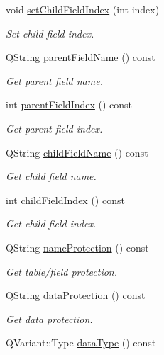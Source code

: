 \begin{DoxyCompactItemize}
void \hyperlink{classmdt_sql_relation_item_a870cfae68f4913225e0ae48554c3163f}{set\-Child\-Field\-Index} (int index)
\begin{DoxyCompactList}\small\item\em Set child field index. \end{DoxyCompactList}\item 
Q\-String \hyperlink{classmdt_sql_relation_item_aa660ce6575b4ce9ad9d551d0b284e528}{parent\-Field\-Name} () const 
\begin{DoxyCompactList}\small\item\em Get parent field name. \end{DoxyCompactList}\item 
int \hyperlink{classmdt_sql_relation_item_a18d078e5e784de2d0e14cbb6238155f9}{parent\-Field\-Index} () const 
\begin{DoxyCompactList}\small\item\em Get parent field index. \end{DoxyCompactList}\item 
Q\-String \hyperlink{classmdt_sql_relation_item_a8cd667086a4ace612b009b0eb7494a1c}{child\-Field\-Name} () const 
\begin{DoxyCompactList}\small\item\em Get child field name. \end{DoxyCompactList}\item 
int \hyperlink{classmdt_sql_relation_item_a89f5e403c31df53c56ddfc4448d8b91d}{child\-Field\-Index} () const 
\begin{DoxyCompactList}\small\item\em Get child field index. \end{DoxyCompactList}\item 
Q\-String \hyperlink{classmdt_sql_relation_item_a2aa445cebd77d6ce707b318f25cc709c}{name\-Protection} () const 
\begin{DoxyCompactList}\small\item\em Get table/field protection. \end{DoxyCompactList}\item 
Q\-String \hyperlink{classmdt_sql_relation_item_a46f16fdee2f8fba86ed82e7f7194751b}{data\-Protection} () const 
\begin{DoxyCompactList}\small\item\em Get data protection. \end{DoxyCompactList}\item 
Q\-Variant\-::\-Type \hyperlink{classmdt_sql_relation_item_a8df1470c61b71ade740266b528f7b9a3}{data\-Type} () const 

\end{DoxyCompactItemize}
